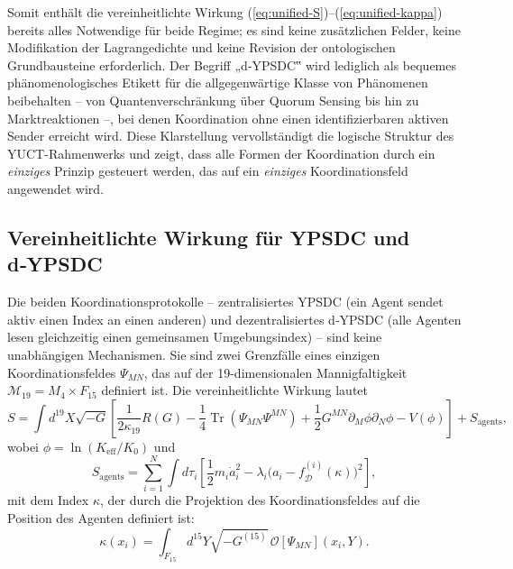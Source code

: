 \documentclass[12pt,a4paper]{article}
\DeclareMathOperator*{\Tr}{Tr}
\begin{document}
	Somit enthält die vereinheitlichte Wirkung (\ref{eq:unified-S})--(\ref{eq:unified-kappa}) bereits alles Notwendige für beide Regime; es sind keine zusätzlichen Felder, keine Modifikation der Lagrangedichte und keine Revision der ontologischen Grundbausteine erforderlich.
	Der Begriff „d‑YPSDC‟ wird lediglich als bequemes phänomenologisches Etikett
	für die allgegenwärtige Klasse von Phänomenen beibehalten – von Quantenverschränkung über Quorum Sensing
	bis hin zu Marktreaktionen –, bei denen Koordination ohne einen identifizierbaren
	aktiven Sender erreicht wird. Diese Klarstellung vervollständigt die logische Struktur des YUCT-Rahmenwerks und zeigt, dass alle Formen der Koordination durch ein
	\emph{einziges} Prinzip gesteuert werden, das auf ein \emph{einziges} Koordinationsfeld angewendet wird.
	
	\subsection{Vereinheitlichte Wirkung für YPSDC und d‑YPSDC}
	\label{subsec:unified-action}
	
	Die beiden Koordinationsprotokolle – zentralisiertes YPSDC (ein Agent sendet aktiv
	einen Index an einen anderen) und dezentralisiertes d‑YPSDC (alle Agenten
	lesen gleichzeitig einen gemeinsamen Umgebungsindex) – sind keine unabhängigen Mechanismen. Sie
	sind zwei Grenzfälle eines einzigen Koordinationsfeldes \(\Psi_{MN}\), das auf
	der 19-dimensionalen Mannigfaltigkeit \(\mathcal{M}_{19}=M_4\times F_{15}\) definiert ist. Die vereinheitlichte
	Wirkung lautet
	\begin{equation}
		S = \int d^{19}X \sqrt{-G} \left[ \frac{1}{2\kappa_{19}} R(G)
		- \frac{1}{4} \Tr(\Psi_{MN}\Psi^{MN}) + \frac{1}{2} G^{MN}\partial_M\phi \partial_N\phi
		- V(\phi) \right] + S_{\mathrm{agents}},
		\label{eq:unified-S}
	\end{equation}
	wobei \(\phi = \ln(K_{\mathrm{eff}}/K_0)\) und
	\begin{equation}
		S_{\mathrm{agents}} = \sum_{i=1}^{N} \int d\tau_i \left[ \frac{1}{2} m_i \dot a_i^2
		- \lambda_i \bigl( a_i - f_{\mathcal{D}}^{(i)}(\kappa) \bigr)^2 \right],
		\label{eq:unified-agents}
	\end{equation}
	mit dem Index \(\kappa\), der durch die Projektion des Koordinationsfeldes
	auf die Position des Agenten definiert ist:
	\begin{equation}
		\kappa(x_i) = \int_{F_{15}} d^{15}Y \sqrt{-G^{(15)}}\,
		\mathcal{O}[\Psi_{MN}](x_i, Y).
		\label{eq:unified-kappa}
	\end{equation}
	
\end{document}
